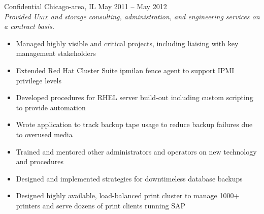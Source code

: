 \documentclass[9pt]{extarticle} %
\begin{document}
\begin{minipage}[c]{\textwidth}

	\begin{indented}
		Confidential \tab Chicago-area, IL \tab May 2011 -- May 2012\\
		\textit{Provided \textsc{Unix} and storage consulting, administration, and engineering services on a contract basis.}
		\begin{itemize}
			\item Managed highly visible and critical projects, including liaising with key management stakeholders
			\item Extended Red Hat Cluster Suite ipmilan fence agent to support IPMI privilege levels
			\item Developed procedures for RHEL server build-out including custom scripting to provide automation
			\item Wrote application to track backup tape usage to reduce backup failures due to overused media
			\item Trained and mentored other administrators and operators on new technology and procedures
			\item Designed and implemented strategies for downtimeless database backups
			\item Designed highly available, load-balanced print cluster to manage 1000+ printers and serve dozens of print clients running SAP
		\end{itemize}
	\end{indented}
\end{minipage}

\bigskip

\end{document}
